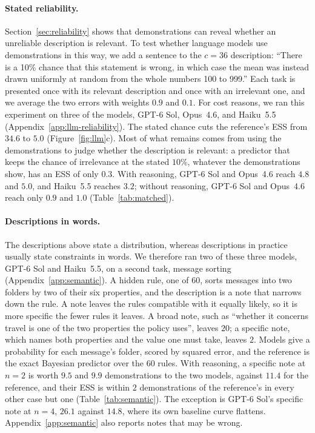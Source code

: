 \documentclass{article}
\theoremstyle{definition}
\begin{document}
\paragraph{Stated reliability.}\label{sec:llm-stated}
Section~\ref{sec:reliability} shows that demonstrations can reveal whether an unreliable description is relevant. To test whether language models use demonstrations in this way, we add a sentence to the $c=36$ description: “There is a 10\% chance that this statement is wrong, in which case the mean was instead drawn uniformly at random from the whole numbers 100 to 999.” Each task is presented once with its relevant description and once with an irrelevant one, and we average the two errors with weights $0.9$ and $0.1$. For cost reasons, we ran this experiment on three of the models, GPT-6 Sol, Opus~4.6, and Haiku~5.5 (Appendix~\ref{app:llm-reliability}). The stated chance cuts the reference's ESS from $34.6$ to $5.0$ (Figure~\ref{fig:llm}c). Most of what remains comes from using the demonstrations to judge whether the description is relevant: a predictor that keeps the chance of irrelevance at the stated $10\%$, whatever the demonstrations show, has an ESS of only $0.3$. With reasoning, GPT-6 Sol and Opus~4.6 reach $4.8$ and $5.0$, and Haiku~5.5 reaches $3.2$; without reasoning, GPT-6 Sol and Opus~4.6 reach only $0.9$ and $1.0$ (Table~\ref{tab:matched}).
\paragraph{Descriptions in words.}
The descriptions above state a distribution, whereas descriptions in practice usually state constraints in words. We therefore ran two of these three models, GPT-6 Sol and Haiku~5.5, on a second task, message sorting (Appendix~\ref{app:semantic}). A hidden rule, one of $60$, sorts messages into two folders by two of their six properties, and the description is a note that narrows down the rule. A note leaves the rules compatible with it equally likely, so it is more specific the fewer rules it leaves. A broad note, such as ``whether it concerns travel is one of the two properties the policy uses'', leaves $20$; a specific note, which names both properties and the value one must take, leaves $2$. Models give a probability for each message's folder, scored by squared error, and the reference is the exact Bayesian predictor over the $60$ rules. With reasoning, a specific note at $n=2$ is worth $9.5$ and $9.9$ demonstrations to the two models, against $11.4$ for the reference, and their ESS is within $2$ demonstrations of the reference's in every other case but one (Table~\ref{tab:semantic}). The exception is GPT-6 Sol's specific note at $n=4$, $26.1$ against $14.8$, where its own baseline curve flattens. Appendix~\ref{app:semantic} also reports notes that may be wrong.
\end{document}
